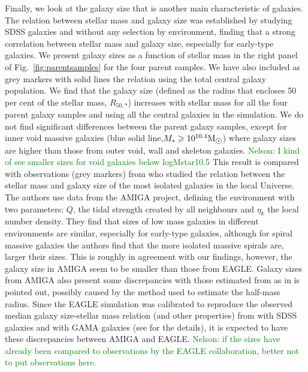 \documentclass[a4paper,fleqn,usenatbib,letter]{mnras}
\newcommand{\Msun}{\rm M_{\sun}}
\begin{document}
Finally, we look at the galaxy size that is another main characteristic of galaxies. The relation between stellar mass and galaxy size was established by  \cite*{shen2003} studying SDSS galaxies and without any selection by environment, finding that a strong correlation between stellar mass and galaxy size, especially for early-type galaxies.  
We present galaxy sizes as a function of stellar mass in the right panel of Fig.~\ref{fig:parentsamples}  for the four parent samples. We have also included as grey markers with solid lines the relation using the total central galaxy population.  We find that the galaxy size (defined as the radius that encloses 50 per cent of the stellar mass, $R_{50,*}$) increases with stellar mass for all the four parent galaxy samples and using all the central galaxies in the simulation. We do not find significant differences between the parent galaxy samples, except for  inner void massive galaxies  (blue solid line,$M_{*}\geq10^{10.4}\Msun$)  where galaxy sizes are higher than those from  outer void, wall and skeleton galaxies. \textcolor{green}{Nelson: I kind of see smaller sizes for void galaxies below logMstar10.5} This result is compared with observations (grey markers) from \cite*{fernandez-lorenzo2013} who studied the relation between the stellar mass and galaxy size of the most isolated galaxies in the local Universe.  The authors use data from the AMIGA project, defining the environment with two parameters: $Q$, the tidal strength created by all neighbours  and $\eta_{k}$ the local number density. They find that sizes of low mass galaxies in different environments are similar, especially for early-type galaxies, although for spiral massive galaxies the authors find  that the more isolated massive spirals are, larger their sizes. This is roughly in agreement with our findings, however, the galaxy size in AMIGA seem to be smaller than those from  EAGLE. 
Galaxy sizes from AMIGA also present some discrepancies  with those estimated from \cite*{shen2003} as in  \cite*{fernandez-lorenzo2013} is  pointed out, possibly caused  by the method used to estimate the half-mass radius. Since the EAGLE simulation was calibrated to reproduce the observed median galaxy size-stellar mass relation (and other properties) from  \cite{shen2003} with SDSS galaxies   and  \cite{baldry2012} with GAMA galaxies (see \citealt{schaye2015} for the details), it is expected to have these discrepancies between AMIGA and EAGLE. \textcolor{green}{Nelson: if the sizes have already been compared to observations by the EAGLE collaboration, better not to put observations here.}
\end{document}
